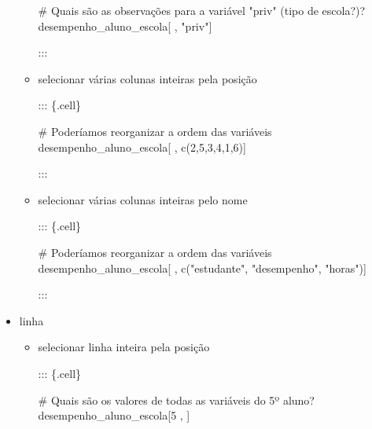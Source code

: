 \documentclass[
  letterpaper,
  DIV=11,
  numbers=noendperiod]{scrreprt}
\newenvironment{Shaded}{\begin{snugshade}}{\end{snugshade}}
\newcommand{\CommentTok}[1]{\textcolor[rgb]{0.37,0.37,0.37}{#1}}
\newcommand{\DecValTok}[1]{\textcolor[rgb]{0.68,0.00,0.00}{#1}}
\newcommand{\FunctionTok}[1]{\textcolor[rgb]{0.28,0.35,0.67}{#1}}
\newcommand{\NormalTok}[1]{\textcolor[rgb]{0.00,0.23,0.31}{#1}}
\newcommand{\StringTok}[1]{\textcolor[rgb]{0.13,0.47,0.30}{#1}}
\begin{document}
\begin{itemize}
\begin{itemize}
\begin{Shaded}
\begin{Highlighting}[]
    \CommentTok{\# Quais são as observações para a variável "priv" (tipo de escola?)? }
\NormalTok{    desempenho\_aluno\_escola[ , }\StringTok{"priv"}\NormalTok{]}
\end{Highlighting}
\end{Shaded}

    :::
  \item
    selecionar várias colunas inteiras pela posição

    ::: \{.cell\}

\begin{Shaded}
\begin{Highlighting}[]
    \CommentTok{\# Poderíamos reorganizar a ordem das variáveis}
\NormalTok{    desempenho\_aluno\_escola[ , }\FunctionTok{c}\NormalTok{(}\DecValTok{2}\NormalTok{,}\DecValTok{5}\NormalTok{,}\DecValTok{3}\NormalTok{,}\DecValTok{4}\NormalTok{,}\DecValTok{1}\NormalTok{,}\DecValTok{6}\NormalTok{)]}
\end{Highlighting}
\end{Shaded}

    :::
  \item
    selecionar várias colunas inteiras pelo nome

    ::: \{.cell\}

\begin{Shaded}
\begin{Highlighting}[]
    \CommentTok{\# Poderíamos reorganizar a ordem das variáveis}
\NormalTok{    desempenho\_aluno\_escola[ , }\FunctionTok{c}\NormalTok{(}\StringTok{"estudante"}\NormalTok{, }\StringTok{"desempenho"}\NormalTok{, }\StringTok{"horas"}\NormalTok{)]}
\end{Highlighting}
\end{Shaded}

    :::
  \end{itemize}
\item
  linha

  \begin{itemize}
  \item
    selecionar linha inteira pela posição

    ::: \{.cell\}

\begin{Shaded}
\begin{Highlighting}[]
    \CommentTok{\# Quais são os valores de todas as variáveis do 5º aluno?  }
\NormalTok{    desempenho\_aluno\_escola[}\DecValTok{5}\NormalTok{ , ]}
\end{Highlighting}
\end{Shaded}


\end{itemize}
\end{itemize}
\end{document}
